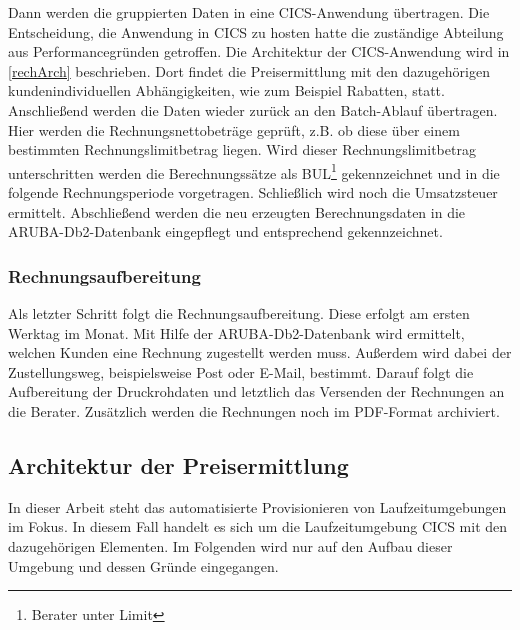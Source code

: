 Dann werden die gruppierten Daten in eine CICS-Anwendung übertragen. Die Entscheidung, die Anwendung in CICS zu hosten hatte die zuständige Abteilung aus Performancegründen getroffen.
Die Architektur der CICS-Anwendung wird in \ref{rechArch} beschrieben.
Dort findet die Preisermittlung mit den dazugehörigen kundenindividuellen Abhängigkeiten, wie zum Beispiel Rabatten, statt.
Anschließend werden die Daten wieder zurück an den Batch-Ablauf übertragen.
Hier werden die Rechnungsnettobeträge geprüft, z.B. ob diese über einem bestimmten Rechnungslimitbetrag liegen.
Wird dieser Rechnungslimitbetrag unterschritten werden die Berechnungssätze als BUL\footnote{Berater unter Limit} gekennzeichnet und in die folgende Rechnungsperiode vorgetragen.
Schließlich wird noch die Umsatzsteuer ermittelt.
Abschließend werden die neu erzeugten Berechnungsdaten in die ARUBA-Db2-Datenbank eingepflegt und entsprechend gekennzeichnet.

\subsubsection{Rechnungsaufbereitung}
Als letzter Schritt folgt die Rechnungsaufbereitung.
Diese erfolgt am ersten Werktag im Monat.
Mit Hilfe der ARUBA-Db2-Datenbank wird ermittelt, welchen Kunden eine Rechnung zugestellt werden muss.
Außerdem wird dabei der Zustellungsweg, beispielsweise Post oder E-Mail, bestimmt.
Darauf folgt die Aufbereitung der Druckrohdaten und letztlich das Versenden der Rechnungen an die Berater.
Zusätzlich werden die Rechnungen noch im PDF-Format archiviert.

\subsection{Architektur der Preisermittlung}\label{ssec:recharch}
In dieser Arbeit steht das automatisierte Provisionieren von Laufzeitumgebungen im Fokus.
In diesem Fall handelt es sich um die Laufzeitumgebung CICS mit den dazugehörigen Elementen.
Im Folgenden wird nur auf den Aufbau dieser Umgebung und dessen Gründe eingegangen.

